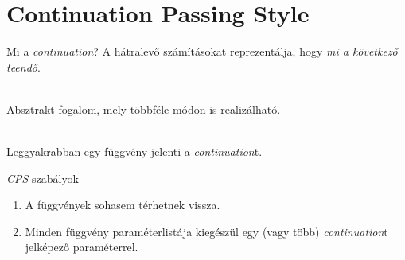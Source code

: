\section{Continuation Passing Style}

\begin{frame}{Mi a \textit{continuation}?}
A hátralevő számításokat reprezentálja, hogy \textit{mi a következő teendő}.

\hfill \\

Absztrakt fogalom, mely többféle módon is realizálható.

\hfill \\

Leggyakrabban egy függvény jelenti a \textit{continuation}t.
\end{frame}

\begin{frame}{\textit{CPS} szabályok}
\begin{enumerate}
\item
A függvények sohasem térhetnek vissza.
\item
Minden függvény paraméterlistája kiegészül egy (vagy több) \textit{continuation}t jelképező paraméterrel.
\end{enumerate}
\end{frame}